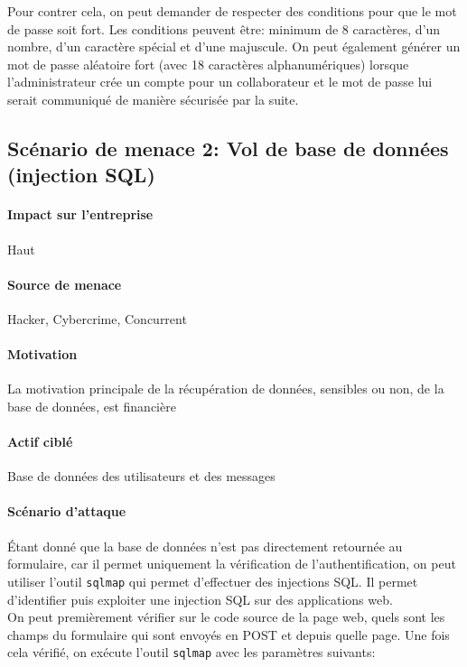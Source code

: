 \documentclass[a4paper,10pt]{article}
\begin{document}
        Pour contrer cela, on peut demander de respecter des conditions pour que le mot de passe soit fort. Les conditions peuvent être: minimum de 8 caractères, d'un nombre, d'un caractère spécial et d'une majuscule. On peut également générer un mot de passe aléatoire fort (avec 18 caractères alphanumériques) lorsque l'administrateur crée un compte pour un collaborateur et le mot de passe lui serait communiqué de manière sécurisée par la suite.
    \subsection*{Scénario de menace 2: Vol de base de données (injection SQL)}
        \paragraph{Impact sur l'entreprise} Haut
        \paragraph{Source de menace} Hacker, Cybercrime, Concurrent
        \paragraph{Motivation} La motivation principale de la récupération de données, sensibles ou non, de la base de données, est financière
        \paragraph{Actif ciblé} Base de données des utilisateurs et des messages
        \paragraph{Scénario d'attaque} Étant donné que la base de données n’est pas directement retournée au formulaire, car il permet uniquement la vérification de l’authentification, on peut utiliser l’outil \verb|sqlmap| qui permet d’effectuer des injections SQL. Il permet d’identifier puis exploiter une injection SQL sur des applications web. \\
        
        On peut premièrement vérifier sur le code source de la page web, quels sont les champs du formulaire qui sont envoyés en POST et depuis quelle page. Une fois cela vérifié, on exécute l’outil \verb|sqlmap| avec les paramètres suivants:
        
\end{document}
